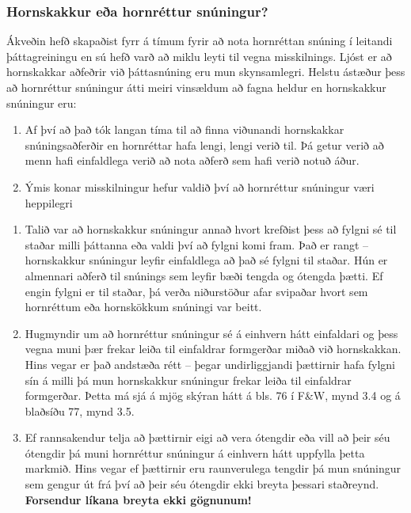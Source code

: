 \documentclass[]{book}
\begin{document}
\hypertarget{hornskakkur-euxf0a-hornruxe9ttur-snuxfaningur}{%
\subsubsection{Hornskakkur eða hornréttur snúningur?}\label{hornskakkur-euxf0a-hornruxe9ttur-snuxfaningur}}

Ákveðin hefð skapaðist fyrr á tímum fyrir að nota hornréttan snúning í leitandi þáttagreiningu en sú hefð varð að miklu leyti til vegna misskilnings. Ljóst er að hornskakkar aðfeðrir við þáttasnúning eru mun skynsamlegri. Helstu ástæður þess að hornréttur snúningur átti meiri vinsældum að fagna heldur en hornskakkur snúningur eru:

\begin{enumerate}
\def\labelenumi{\arabic{enumi})}
\item
  Af því að það tók langan tíma til að finna viðunandi hornskakkar snúningsaðferðir en hornréttar hafa lengi, lengi verið til. Þá getur verið að menn hafi einfaldlega verið að nota aðferð sem hafi verið notuð áður.
\item
  Ýmis konar misskilningur hefur valdið því að hornréttur snúningur væri heppilegri
\end{enumerate}

\begin{enumerate}
\def\labelenumi{\alph{enumi})}
\item
  Talið var að hornskakkur snúningur annað hvort krefðist þess að fylgni sé til staðar milli þáttanna eða valdi því að fylgni komi fram. Það er rangt -- hornskakkur snúningur leyfir einfaldlega að það sé fylgni til staðar. Hún er almennari aðferð til snúnings sem leyfir bæði tengda og ótengda þætti. Ef engin fylgni er til staðar, þá verða niðurstöður afar svipaðar hvort sem hornréttum eða hornskökkum snúningi var beitt.
\item
  Hugmyndir um að hornréttur snúningur sé á einhvern hátt einfaldari og þess vegna muni þær frekar leiða til einfaldrar formgerðar miðað við hornskakkan. Hins vegar er það andstæða rétt -- þegar undirliggjandi þættirnir hafa fylgni sín á milli þá mun hornskakkur snúningur frekar leiða til einfaldrar formgerðar. Þetta má sjá á mjög skýran hátt á bls. 76 í F\&W, mynd 3.4 og á blaðsíðu 77, mynd 3.5.
\item
  Ef rannsakendur telja að þættirnir eigi að vera ótengdir eða vill að þeir séu ótengdir þá muni hornréttur snúningur á einhvern hátt uppfylla þetta markmið. Hins vegar ef þættirnir eru raunverulega tengdir þá mun snúningur sem gengur út frá því að þeir séu ótengdir ekki breyta þessari staðreynd. \textbf{Forsendur líkana breyta ekki gögnunum!}
\end{enumerate}
\end{document}
